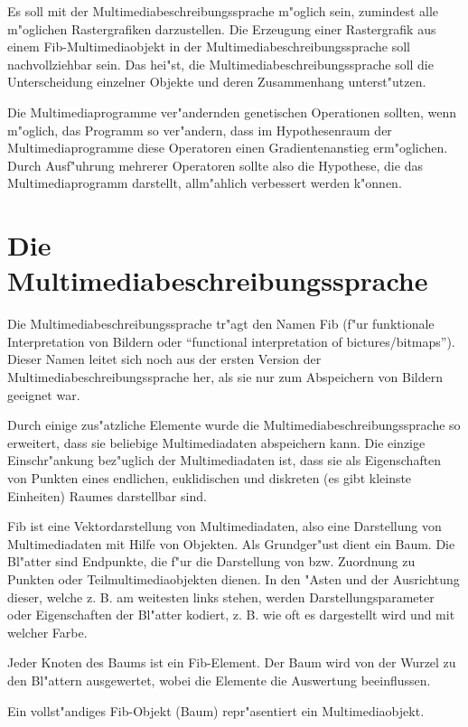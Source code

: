 Es soll mit der Multimediabeschreibungssprache m"oglich sein, zumindest alle m"oglichen Rastergrafiken darzustellen.
Die Erzeugung einer Rastergrafik aus einem Fib-Multimediaobjekt in der Multimediabeschreibungssprache soll nachvollziehbar sein. Das hei"st, die Multimediabeschreibungssprache soll die Unterscheidung einzelner Objekte und deren Zusammenhang unterst"utzen.

Die Multimediaprogramme ver"andernden genetischen Operationen sollten, wenn m"oglich, das Programm so ver"andern, dass im Hypothesenraum der Multimediaprogramme diese Operatoren einen Gradientenanstieg erm"oglichen. Durch Ausf"uhrung mehrerer Operatoren sollte also die Hypothese, die das Multimediaprogramm darstellt, allm"ahlich verbessert werden k"onnen.


\section{Die Multimediabeschreibungssprache}

Die Multimediabeschreibungssprache tr"agt den Namen Fib (f"ur funktionale Interpretation von Bildern oder ``functional interpretation of bictures/bitmaps''). Dieser Namen leitet sich noch aus der ersten Version der Multimediabeschreibungssprache her, als sie nur zum Abspeichern von Bildern geeignet war.

Durch einige zus"atzliche Elemente wurde die Multimediabeschreibungssprache so erweitert, dass sie beliebige Multimediadaten abspeichern kann. Die einzige Einschr"ankung bez"uglich der Multimediadaten ist, dass sie als Eigenschaften von Punkten eines endlichen, euklidischen und diskreten (es gibt kleinste Einheiten) Raumes darstellbar sind.

Fib ist eine Vektordarstellung von Multimediadaten, also eine Darstellung von Multimediadaten mit Hilfe von Objekten.
Als Grundger"ust dient ein Baum. Die Bl"atter sind Endpunkte, die f"ur die Darstellung von bzw. Zuordnung zu Punkten oder Teilmultimediaobjekten dienen. In den "Asten und der Ausrichtung dieser, welche z. B. am weitesten links stehen, werden Darstellungsparameter oder Eigenschaften der Bl"atter kodiert, z. B. wie oft es dargestellt wird und mit welcher Farbe.

Jeder Knoten des Baums ist ein Fib-Element. Der Baum wird von der Wurzel zu den Bl"attern ausgewertet, wobei die Elemente die Auswertung beeinflussen.

Ein vollst"andiges Fib-Objekt (Baum) repr"asentiert ein Multimediaobjekt.

